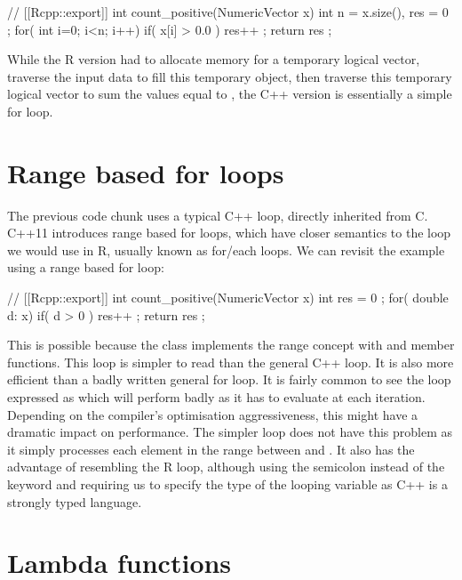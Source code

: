 \begin{example}
// [[Rcpp::export]]
int count_positive(NumericVector x){
  int n = x.size(), res = 0 ;
  for( int i=0; i<n; i++) if( x[i] > 0.0 ) res++ ;
  return res ;
}
\end{example}

While the R version had to allocate memory for a temporary logical
vector, traverse the input data to fill this temporary object, then
traverse this temporary logical vector to sum the values equal to ,
the C++ version is essentially a simple for loop.

\section{Range based for loops}

The previous code chunk uses a typical C++  loop, directly
inherited from C. C++11 introduces range based for loops, which have
closer semantics to the loop we would use in R, usually known as
for/each loops. We can revisit the example using a range based for loop:

\begin{example}
// [[Rcpp::export]]
int count_positive(NumericVector x){
  int res = 0 ;
  for( double d: x){
    if( d > 0 ) res++ ;
  }
  return res ;
}
\end{example}

This is possible because the  class implements
the range concept with  and  member functions. This
 loop is simpler to read than the general C++  loop. It is also
more efficient than a badly written general for loop. It is fairly
common to see the loop expressed as  which
will perform badly as it has to evaluate  at each iteration.
Depending on the compiler's optimisation aggressiveness, this might have a
dramatic impact on performance. The simpler  loop does not
have this problem as it simply processes each element in the range between
 and . It also has the advantage of
resembling the R loop, although using the semicolon instead of the  keyword
and requiring us to specify the type of the looping variable  as C++
is a strongly typed language.

\section{Lambda functions}

